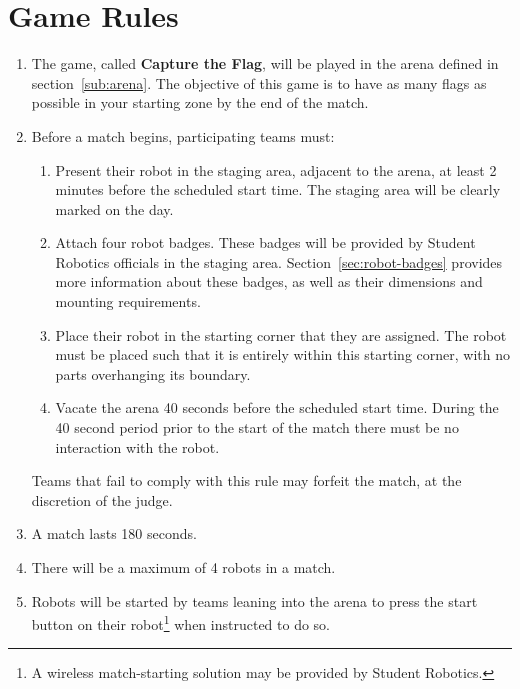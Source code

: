 \section {Game Rules}
\label{game-rules}

\begin{enumerate}
\item The game, called \textbf{Capture the Flag}, will be played in the arena defined in section~\ref{sub:arena}.
      The objective of this game is to have as many flags as possible in your starting zone by the end of the match.

\item Before a match begins, participating teams must:
\begin {enumerate}
  \item Present their robot in the staging area, adjacent to the arena, at least 2 minutes before the scheduled start time.
        The staging area will be clearly marked on the day.

  \item Attach four robot badges.
        These badges will be provided by Student Robotics officials in the staging area.
        Section~\ref{sec:robot-badges} provides more information about these badges, as well as their dimensions and mounting requirements.

  \item Place their robot in the starting corner that they are assigned.
        The robot must be placed such that it is entirely within this starting corner, with no parts overhanging its boundary.

  \item Vacate the arena 40 seconds before the scheduled start time.
        During the 40 second period prior to the start of the match there must be no interaction with the robot.
\end{enumerate}
  Teams that fail to comply with this rule may forfeit the match, at the discretion of the judge.

\item A match lasts 180 seconds.

\item There will be a maximum of 4 robots in a match.

\item Robots will be started by teams leaning into the arena to press the start button on their robot\footnote{A wireless match-starting solution may be provided by Student Robotics.} when instructed to do so.


\end{enumerate}
